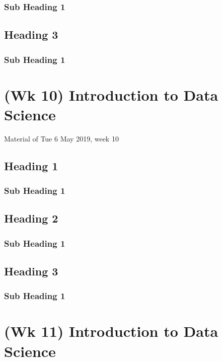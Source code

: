 \documentclass[]{book}
\begin{document}
\subsection{Sub Heading 1}\label{sub-heading-1-19}

\section{Heading 3}\label{heading-3-6}

\subsection{Sub Heading 1}\label{sub-heading-1-20}

\chapter{(Wk 10) Introduction to Data
Science}\label{wk-10-introduction-to-data-science}

Material of Tue 6 May 2019, week 10

\section{Heading 1}\label{heading-1-7}

\subsection{Sub Heading 1}\label{sub-heading-1-21}

\section{Heading 2}\label{heading-2-7}

\subsection{Sub Heading 1}\label{sub-heading-1-22}

\section{Heading 3}\label{heading-3-7}

\subsection{Sub Heading 1}\label{sub-heading-1-23}

\chapter{(Wk 11) Introduction to Data
Science}\label{wk-11-introduction-to-data-science}
\end{document}
